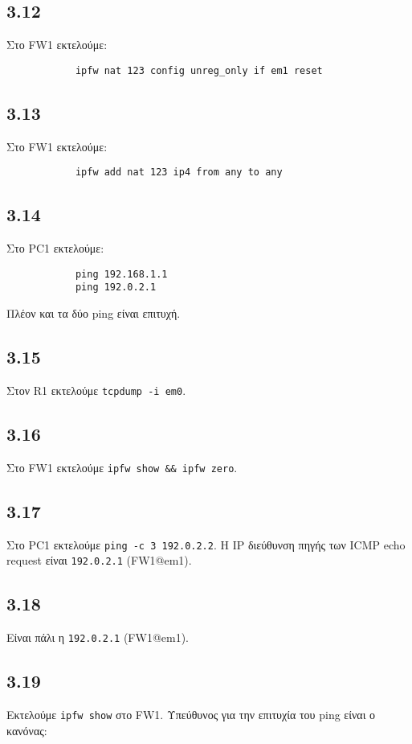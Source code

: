 \documentclass[a4paper, 12pt]{article}
\begin{document}
	\subsection*{3.12}
		Στο FW1 εκτελούμε:
		
		\begin{verbatim}
			ipfw nat 123 config unreg_only if em1 reset 
		\end{verbatim}

	\subsection*{3.13}
		Στο FW1 εκτελούμε:
		
		\begin{verbatim}
			ipfw add nat 123 ip4 from any to any  
		\end{verbatim}

	\subsection*{3.14}
		Στο PC1 εκτελούμε:
		
		\begin{verbatim}
			ping 192.168.1.1
			ping 192.0.2.1
		\end{verbatim}
		
		Πλέον και τα δύο ping είναι επιτυχή.

	\subsection*{3.15}
		Στον R1 εκτελούμε \verb|tcpdump -i em0|.

	\subsection*{3.16}
		Στο FW1 εκτελούμε \verb|ipfw show && ipfw zero|.
		
	\subsection*{3.17}
		Στο PC1 εκτελούμε \verb|ping -c 3 192.0.2.2|. Η IP διεύθυνση πηγής των ICMP echo request είναι \verb|192.0.2.1| (FW1@em1).
		
	\subsection*{3.18}
		Είναι πάλι η \verb|192.0.2.1| (FW1@em1).

	\subsection*{3.19}
		Εκτελούμε \verb|ipfw show| στο FW1. Υπεύθυνος για την επιτυχία του ping είναι ο κανόνας:
				
\end{document}
